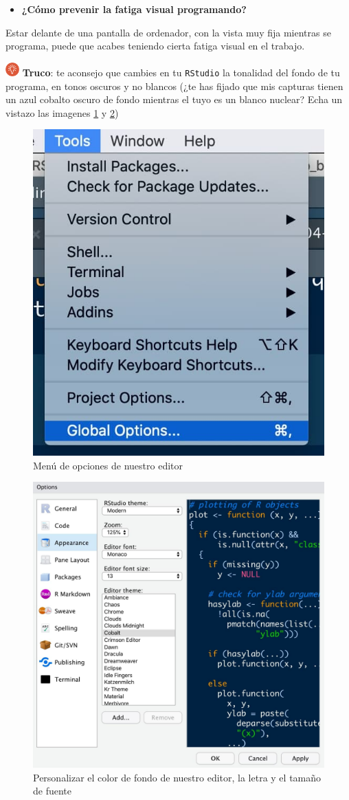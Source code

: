 \documentclass[11pt,]{book}
\providecommand{\tightlist}{%
  \setlength{\itemsep}{0pt}\setlength{\parskip}{0pt}}
\begin{document}
\begin{itemize}
\tightlist
\item
  \textbf{¿Cómo prevenir la fatiga visual programando?}
\end{itemize}

Estar delante de una pantalla de ordenador, con la vista muy fija mientras se programa, puede que acabes teniendo cierta fatiga visual en el trabajo.

\includegraphics[width=0.04\textwidth,height=\textheight]{img/logo_info.png} \textbf{Truco}: te aconsejo que cambies en tu \texttt{RStudio} la tonalidad del fondo de tu programa, en tonos oscuros y no blancos (¿te has fijado que mis capturas tienen un azul cobalto oscuro de fondo mientras el tuyo es un blanco nuclear? Echa un vistazo las imagenes \ref{fig:menu-1} y \ref{fig:menu-2})

\begin{figure}

{\centering \includegraphics[width=0.4\linewidth,height=0.4\textheight]{./img/menu_1} 

}

\caption{Menú de opciones de nuestro editor}\label{fig:menu-1}
\end{figure}

\begin{figure}

{\centering \includegraphics[width=0.4\linewidth,height=0.4\textheight]{./img/menu_2} 

}

\caption{Personalizar el color de fondo de nuestro editor, la letra y el tamaño de fuente}\label{fig:menu-2}
\end{figure}
\end{document}
